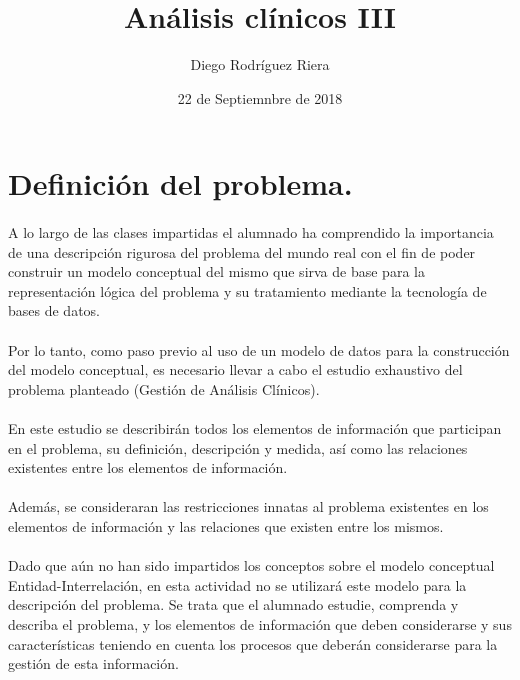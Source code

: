 \documentclass[a4paper,10pt]{article}
\title{Análisis clínicos III}
\author{Diego Rodríguez Riera}
\date{22 de Septiemnbre de 2018}
\begin{document}
\maketitle
\pagebreak
\tableofcontents
\pagebreak

\section{Definición del problema.}
\paragraph{}
A lo largo de las clases impartidas el alumnado ha comprendido la importancia de una descripción rigurosa del problema del mundo real con el fin de poder construir un modelo conceptual del mismo que sirva de base para la representación lógica del problema y su tratamiento mediante la tecnología de bases de datos.
\paragraph{}
Por lo tanto, como paso previo al uso de un modelo de datos para la construcción del modelo conceptual, es necesario llevar a cabo el estudio exhaustivo del problema planteado (Gestión de Análisis Clínicos).
\paragraph{}
En este estudio se describirán todos los elementos de información que participan en el problema, su definición, descripción y medida, así como las relaciones existentes entre los elementos de información.
\paragraph{}
Además, se consideraran las restricciones innatas al problema existentes en los elementos de información y las relaciones que existen entre los mismos.
\paragraph{}
Dado que aún no han sido impartidos los conceptos sobre el modelo conceptual Entidad-Interrelación, en esta actividad no se utilizará este modelo para la descripción del problema. Se trata que el alumnado estudie, comprenda y describa el problema, y los elementos de información que deben considerarse y sus características teniendo en cuenta los procesos que deberán considerarse para la gestión de esta información.
\pagebreak
\end{document}
